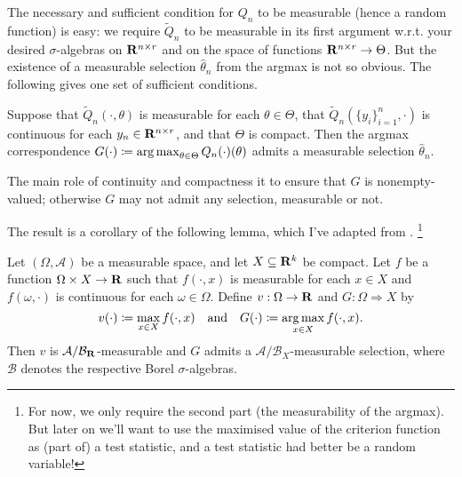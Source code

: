 \documentclass[11pt,letterpaper,reqno,oneside]{article}
\begin{document}
The necessary and sufficient condition for $Q_n$ to be measurable (hence a random function) is easy: we require $\widetilde{Q}_n$ to be measurable in its first argument w.r.t. your desired $\sigma$-algebras on $\mathbf{R}^{n \times r}$ and on the space of functions $\mathbf{R}^{n \times r} \to \Theta$. But the existence of a measurable selection $\widehat{\theta}_n$ from the argmax is not so obvious. The following gives one set of sufficient conditions.
%
\begin{proposition}
	\label{proposition:extremum_measurable}
	Suppose that $\widetilde{Q}_n(\cdot,\theta)$ is measurable for each $\theta \in \Theta$, that $\widetilde{Q}_n\left( \{y_i\}_{i=1}^n, \cdot \right)$ is continuous for each $y_n \in \mathbf{R}^{n \times r}$, and that $\Theta$ is compact. Then the argmax correspondence $G(\cdot) \coloneqq \operatorname*{arg\,max}_{\theta \in \Theta} Q_n(\cdot)(\theta)$ admits a measurable selection $\widehat{\theta}_n$.
\end{proposition}

\begin{remark}
	The main role of continuity and compactness it to ensure that $G$ is nonempty-valued; otherwise $G$ may not admit any selection, measurable or not.
\end{remark}


The result is a corollary of the following lemma, which I've adapted from \textcite[][Theorem 18.19]{AliprantisBorder2006}.%
	\footnote{For now, we only require the second part (the measurability of the argmax). But later on we'll want to use the maximised value of the criterion function as (part of) a test statistic, and a test statistic had better be a random variable!}
%
\begin{lemma}
	\label{lemma:measurable_max}
	Let $(\Omega,\mathcal{A})$ be a measurable space, and let $X \subseteq \mathbf{R}^k$ be compact. Let $f$ be a function $\Omega \times X \to \mathbf{R}$ such that $f(\cdot,x)$ is measurable for each $x \in X$ and $f(\omega,\cdot)$ is continuous for each $\omega \in \Omega$. Define $v : \Omega \to \mathbf{R}$ and $G : \Omega \Rightarrow X$ by
	\begin{equation*}
		v(\cdot) \coloneqq \max_{x \in X} f(\cdot,x)
		\quad\text{and}\quad
		G(\cdot) \coloneqq \operatorname*{arg\,max}_{x \in X} f(\cdot,x) .
	\end{equation*}
	Then $v$ is $\mathcal{A}/\mathcal{B}_{\mathbf{R}}$-measurable and $G$ admits a $\mathcal{A}/\mathcal{B}_X$-measurable selection, where $\mathcal{B}$ denotes the respective Borel $\sigma$-algebras.
\end{lemma}
\end{document}
